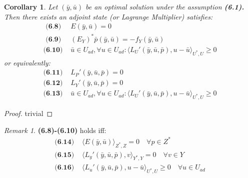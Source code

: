 \documentclass[a4paper,11pt,fleqn]{book}
\newtheorem{corollary}{Corollary}[theorem]
\theoremstyle{definition}
\theoremstyle{remark}
\newtheorem*{remark}{Remark}
\begin{document}
\begin{corollary}
	Let $(\bar{y}, \bar{u})$ be an optimal solution under the assumption \textbf{(6.1).} Then there exists an adjoint state (or Lagrange Multiplier) satisfies:
	\begin{align*}
	\textbf{ (6.8) }	&E(\bar{y}, \bar{u}) = 0 \\
	\textbf{ (6.9) }	&(E_Y)^* \bar{p}(\bar{y}, \bar{u}) = -f_Y(\bar{y}, \bar{u})\\
	\textbf{(6.10) }	&\bar{u} \in U_{ad}, \forall u \in U_{ad}: 
		\langle L_U'(\bar{y}, \bar{u}, \bar{p})   , u - \bar{u} \rangle_{U^*, U} \ge 0
	\end{align*}
	or equivalently:
	\begin{align*}
		\textbf{(6.11) }
		&L_P'(\bar{y}, \bar{u}, \bar{p}) = 0\\
		\textbf{(6.12) }
		&L_Y'(\bar{y}, \bar{u}, \bar{p}) = 0\\
		\textbf{(6.13) }
		&\bar{u} \in U_{ad}, \forall u \in U_{ad}: 
		\langle L_U'(\bar{y}, \bar{u}, \bar{p})   , u - \bar{u} \rangle_{U^*, U} \ge 0
	\end{align*}
\end{corollary}
\begin{proof}
	trivial
\end{proof}
\begin{remark}
\textbf{(6.8)-(6.10)} holds iff:
\begin{align*}
	\textbf{(6.14) }&
	\langle E(\bar{y}, \bar{u}) \rangle_{Z^*, Z} = 0 \quad \forall p \in Z^*\\
	\textbf{(6.15) }&
	\langle L_y'(\bar{y}, \bar{u}, \bar{p}), v \rangle_{Y^*, Y} = 0 \quad \forall v \in Y\\
	\textbf{(6.16) }&
	\langle L_u'(\bar{y}, \bar{u}, \bar{p}), u - \bar{u} \rangle_{U^*, U} \ge 0 \quad \forall u \in U_{ad}
\end{align*}	
\end{remark}
\end{document}
